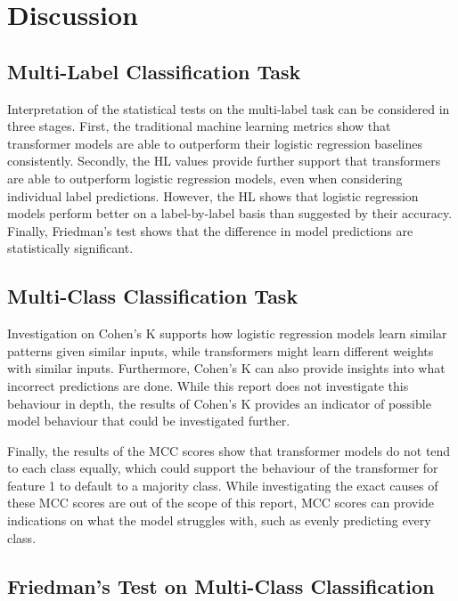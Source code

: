 \documentclass[10.7pt, onecolumn]{article}
\begin{document}
\section{Discussion}\label{discussion and conclusion}

\subsection{Multi-Label Classification Task}
Interpretation of the statistical tests on the multi-label task can be considered in three stages. First, the traditional machine learning metrics show that transformer models are able to outperform their logistic regression baselines consistently. Secondly, the HL values provide further support that transformers are able to outperform logistic regression models, even when considering individual label predictions. However, the HL shows that logistic regression models perform better on a label-by-label basis than suggested by their accuracy. Finally, Friedman's test shows that the difference in model predictions are statistically significant.


\subsection{Multi-Class Classification Task}

Investigation on Cohen's K supports how logistic regression models learn similar patterns given similar inputs, while transformers might learn different weights with similar inputs. Furthermore, Cohen's K can also provide insights into what incorrect predictions are done. While this report does not investigate this behaviour in depth, the results of Cohen's K provides an indicator of possible model behaviour that could be investigated further.

Finally, the results of the MCC scores show that transformer models do not tend to each class equally, which could support the behaviour of the transformer for feature 1 to default to a majority class. While investigating the exact causes of these MCC scores are out of the scope of this report, MCC scores can provide indications on what the model struggles with, such as evenly predicting every class.

\subsection{Friedman's Test on Multi-Class Classification}
\end{document}
